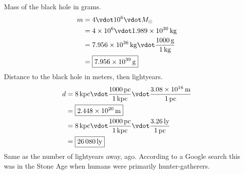 \documentclass{homework}
\begin{document}
\maketitle

\question
\begin{alphaparts}
    \questionpart Mass of the black hole in grams.
    \begin{align*}
        m	&= 	4 \vdot \num{e6} \vdot  M_\odot  \\
            &=  \num{4e6} \vdot \SI{1.989e30}{\kilogram}    \\
            &=  \SI{7.956e36}{\kilogram} \vdot \frac{\SI{1000}{\gram}}{\SI{1}{\kilogram}}   \\
            &=  \boxed{\SI{7.956e39}{\gram}}
    \end{align*}
    \questionpart Distance to the black hole in meters, then lightyears.
    \begin{align*}
        d   &=  \SI{8}{kpc} \vdot \frac{\SI{1000}{pc}}{\SI{1}{kpc}} \vdot \frac{\SI{3.08e16}{\metre}}{\SI{1}{pc}} \\
            &=  \boxed{\SI{2.448e20}{\metre}}    \\
            &=  \SI{8}{kpc} \vdot \frac{\SI{1000}{pc}}{\SI{1}{kpc}} \vdot \frac{\SI{3.26}{ly}}{\SI{1}{pc}}  \\
            &=  \boxed{\SI{26080}{ly}}
    \end{align*}
    \questionpart Same as the number of lightyears away,  ago. According to a Google search this was in the Stone Age when humans were primarily hunter-gatherers.
\end{alphaparts}
\end{document}
